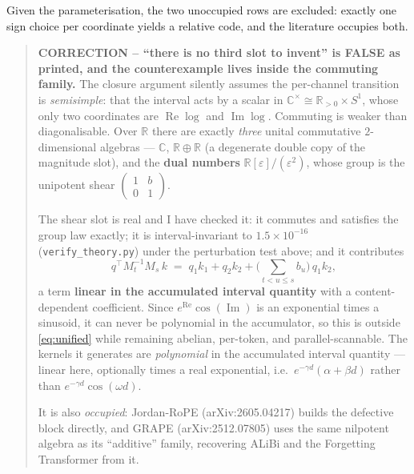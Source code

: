 \documentclass[11pt]{article}
\newcommand{\R}{\mathbb{R}}
\newcommand{\C}{\mathbb{C}}
\begin{document}
\noindent Given the parameterisation, the two unoccupied rows are excluded:
exactly one sign choice per coordinate yields a relative code, and the literature
occupies both.

\begin{quote}\small
\textbf{CORRECTION -- ``there is no third slot to invent'' is FALSE as printed,
and the counterexample lives inside the commuting family.} The closure argument
silently assumes the per-channel transition is \emph{semisimple}: that the
interval acts by a scalar in $\C^\times \cong \R_{>0}\times S^1$, whose only two
coordinates are $\operatorname{Re}\log$ and $\operatorname{Im}\log$. Commuting is
weaker than diagonalisable. Over $\R$ there are exactly \emph{three} unital
commutative $2$-dimensional algebras --- $\C$, $\R\oplus\R$ (a degenerate double
copy of the magnitude slot), and the \textbf{dual numbers}
$\R[\varepsilon]/(\varepsilon^2)$, whose group is the unipotent shear
$\left(\begin{smallmatrix}1&b\\0&1\end{smallmatrix}\right)$.

The shear slot is real and I have checked it: it commutes and satisfies the group
law exactly; it is interval-invariant to $1.5\times10^{-16}$ (\texttt{verify\_theory.py}) under the perturbation
test above; and it contributes
\[
  q^{\!\top} M_t^{-1}M_s\,k \;=\; q_1k_1 + q_2k_2 +
  \Big(\textstyle\sum_{t<u\le s} b_u\Big)\,q_1k_2 ,
\]
a term \textbf{linear in the accumulated interval quantity} with a
content-dependent coefficient. Since $e^{\operatorname{Re}}\cos(\operatorname{Im})$
is an exponential times a sinusoid, it can never be polynomial in the accumulator,
so this is outside \eqref{eq:unified} while remaining abelian, per-token, and
parallel-scannable. The kernels it generates are \emph{polynomial} in the accumulated interval quantity --- linear here, optionally times a real exponential, i.e.\ $e^{-\gamma d}(\alpha+\beta d)$
rather than $e^{-\gamma d}\cos(\omega d)$.

It is also \emph{occupied}: Jordan-RoPE (arXiv:2605.04217) builds the defective
block directly, and GRAPE (arXiv:2512.07805) uses the same nilpotent algebra as
its ``additive'' family, recovering ALiBi and the Forgetting Transformer from it.
\end{quote}
\end{document}
